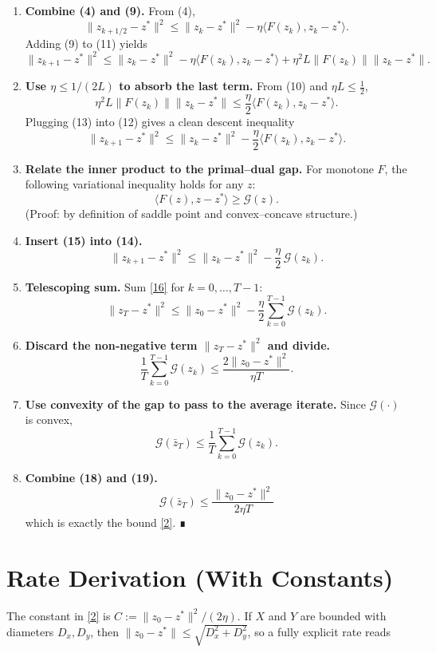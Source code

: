 \documentclass{article}
\newcommand{\gap}{\mathcal{G}}
\begin{document}
\begin{enumerate}[label=[Step \arabic*], leftmargin=*]
\item \textbf{Combine (4) and (9).}  
From (4),
\[
\|z_{k+1/2}-z^{*}\|^{2}\le\|z_{k}-z^{*}\|^{2}-\eta\langle F(z_{k}),z_{k}-z^{*}\rangle .
\tag{11}
\]
Adding (9) to (11) yields
\[
\|z_{k+1}-z^{*}\|^{2}
\le\|z_{k}-z^{*}\|^{2}
-\eta\langle F(z_{k}),z_{k}-z^{*}\rangle
+\eta^{2}L\|F(z_{k})\|\|z_{k}-z^{*}\|.
\tag{12}
\]

\item \textbf{Use $\eta\le 1/(2L)$ to absorb the last term.}  
From (10) and $\eta L\le \tfrac12$,
\[
\eta^{2}L\|F(z_{k})\|\|z_{k}-z^{*}\|
\le \frac{\eta}{2}\langle F(z_{k}),z_{k}-z^{*}\rangle .
\tag{13}
\]
Plugging (13) into (12) gives a clean descent inequality
\[
\|z_{k+1}-z^{*}\|^{2}
\le\|z_{k}-z^{*}\|^{2}
-\frac{\eta}{2}\langle F(z_{k}),z_{k}-z^{*}\rangle .
\tag{14}
\]

\item \textbf{Relate the inner product to the primal–dual gap.}  
For monotone $F$, the following variational inequality holds for any $z$:
\[
\langle F(z),z-z^{*}\rangle \ge \gap(z).
\tag{15}
\]
(Proof: by definition of saddle point and convex–concave structure.)

\item \textbf{Insert (15) into (14).}  
\[
\|z_{k+1}-z^{*}\|^{2}
\le\|z_{k}-z^{*}\|^{2}
-\frac{\eta}{2}\,\gap(z_{k}).
\tag{16}
\]

\item \textbf{Telescoping sum.}  
Sum \eqref{16} for $k=0,\dots,T-1$:
\[
\|z_{T}-z^{*}\|^{2}
\le\|z_{0}-z^{*}\|^{2}
-\frac{\eta}{2}\sum_{k=0}^{T-1}\gap(z_{k}).
\tag{17}
\]

\item \textbf{Discard the non‑negative term $\|z_{T}-z^{*}\|^{2}$ and divide.}
\[
\frac{1}{T}\sum_{k=0}^{T-1}\gap(z_{k})
\le \frac{2\|z_{0}-z^{*}\|^{2}}{\eta T}.
\tag{18}
\]

\item \textbf{Use convexity of the gap to pass to the average iterate.}  
Since $\gap(\cdot)$ is convex,
\[
\gap(\bar z_{T})\le\frac{1}{T}\sum_{k=0}^{T-1}\gap(z_{k}).
\tag{19}
\]

\item \textbf{Combine (18) and (19).}  
\[
\boxed{\;\gap(\bar z_{T})\le\frac{\|z_{0}-z^{*}\|^{2}}{2\eta T}\;}
\]
which is exactly the bound \eqref{2}.  ∎
\end{enumerate}

\section*{Rate Derivation (With Constants)}
The constant in \eqref{2} is $C:=\|z_{0}-z^{*}\|^{2}/(2\eta)$.  
If $X$ and $Y$ are bounded with diameters $D_{x},D_{y}$, then $\|z_{0}-z^{*}\|\le\sqrt{D_{x}^{2}+D_{y}^{2}}$,
so a fully explicit rate reads  
\end{document}
